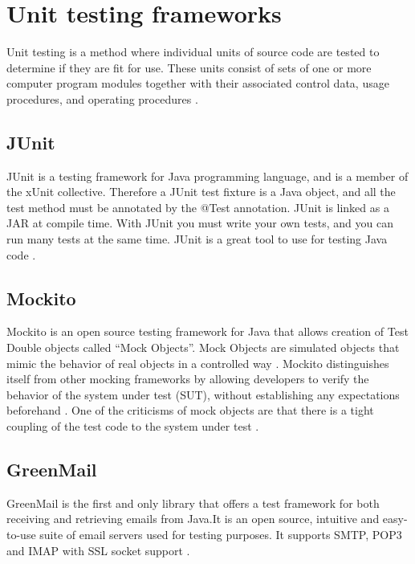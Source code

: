 \section{Unit testing frameworks}

Unit testing is a method where individual units of source code are tested to determine if they are fit for use. These units consist of sets of one or more computer program modules together with their associated control data, usage procedures, and operating procedures \cite{bib:kolawa}.

\subsection{JUnit}
JUnit is a testing framework for Java programming language, and is a member of the xUnit collective. Therefore a JUnit test fixture is a Java object, and all the test method must be annotated by the @Test annotation. JUnit is linked as a JAR at compile time. With JUnit you must write your own tests, and you can run many tests at the same time. JUnit is a great tool to use for testing Java code \cite{bib:junit}.

\subsection{Mockito}
Mockito is an open source testing framework for Java that allows creation of Test Double objects called “Mock Objects”. Mock Objects are simulated objects that mimic the behavior of real objects in a controlled way \cite{bib:mock}.
\newline
\newline
Mockito distinguishes itself from other mocking frameworks by allowing developers to verify the behavior of the system under test (SUT), without establishing any expectations beforehand \cite{bib:mockito}.
One of the criticisms of mock objects are that there is a tight coupling of the test code to the system under test \cite{bib:mocks}.

\subsection{GreenMail}
GreenMail is the first and only library that offers a test framework for both receiving and retrieving emails from Java.It is an open source, intuitive and easy-to-use suite of email servers used for testing purposes. It supports SMTP, POP3 and IMAP with SSL socket support \cite{bib:greenmail}.

